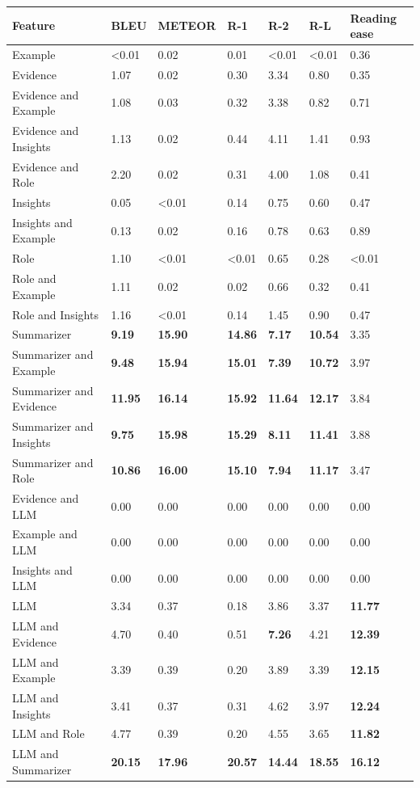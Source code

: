 \begin{tabular}{|l|l|l|l|l|l|l|}
\hline
\textbf{Feature} & BLEU & METEOR & R-1 & R-2 & R-L & Reading ease \\
 \hline
 Example & \textless{}0.01 & 0.02 & 0.01 & \textless{}0.01 & \textless{}0.01 & 0.36 \\
 \hline
 Evidence & 1.07 & 0.02 & 0.30 & 3.34 & 0.80 & 0.35 \\
 \hline
 Evidence and Example & 1.08 & 0.03 & 0.32 & 3.38 & 0.82 & 0.71 \\
 \hline
 Evidence and Insights & 1.13 & 0.02 & 0.44 & 4.11 & 1.41 & 0.93 \\
 \hline
 Evidence and Role & 2.20 & 0.02 & 0.31 & 4.00 & 1.08 & 0.41 \\
 \hline
 Insights & 0.05 & \textless{}0.01 & 0.14 & 0.75 & 0.60 & 0.47 \\
 \hline
 Insights and Example & 0.13 & 0.02 & 0.16 & 0.78 & 0.63 & 0.89 \\
 \hline
 Role & 1.10 & \textless{}0.01 & \textless{}0.01 & 0.65 & 0.28 & \textless{}0.01 \\
 \hline
 Role and Example & 1.11 & 0.02 & 0.02 & 0.66 & 0.32 & 0.41 \\
 \hline
 Role and Insights & 1.16 & \textless{}0.01 & 0.14 & 1.45 & 0.90 & 0.47 \\
 \hline
 Summarizer & \textbf{9.19} & \textbf{15.90} & \textbf{14.86} & \textbf{7.17} & \textbf{10.54} & 3.35 \\
 \hline
 Summarizer and Example & \textbf{9.48} & \textbf{15.94} & \textbf{15.01} & \textbf{7.39} & \textbf{10.72} & 3.97 \\
 \hline
 Summarizer and Evidence & \textbf{11.95} & \textbf{16.14} & \textbf{15.92} & \textbf{11.64} & \textbf{12.17} & 3.84 \\
 \hline
 Summarizer and Insights & \textbf{9.75} & \textbf{15.98} & \textbf{15.29} & \textbf{8.11} & \textbf{11.41} & 3.88 \\
 \hline
 Summarizer and Role & \textbf{10.86} & \textbf{16.00} & \textbf{15.10} & \textbf{7.94} & \textbf{11.17} & 3.47 \\
 \hline
 Evidence and LLM & 0.00 & 0.00 & 0.00 & 0.00 & 0.00 & 0.00 \\
 \hline
 Example and LLM & 0.00 & 0.00 & 0.00 & 0.00 & 0.00 & 0.00 \\
 \hline
 Insights and LLM & 0.00 & 0.00 & 0.00 & 0.00 & 0.00 & 0.00 \\
 \hline
 LLM & 3.34 & 0.37 & 0.18 & 3.86 & 3.37 & \textbf{11.77} \\
 \hline
 LLM and Evidence & 4.70 & 0.40 & 0.51 & \textbf{7.26} & 4.21 & \textbf{12.39} \\
 \hline
 LLM and Example & 3.39 & 0.39 & 0.20 & 3.89 & 3.39 & \textbf{12.15} \\
 \hline
 LLM and Insights & 3.41 & 0.37 & 0.31 & 4.62 & 3.97 & \textbf{12.24} \\
 \hline
 LLM and Role & 4.77 & 0.39 & 0.20 & 4.55 & 3.65 & \textbf{11.82} \\
 \hline
 LLM and Summarizer & \textbf{20.15} & \textbf{17.96} & \textbf{20.57} & \textbf{14.44} & \textbf{18.55} & \textbf{16.12} \\
\hline
\end{tabular}
